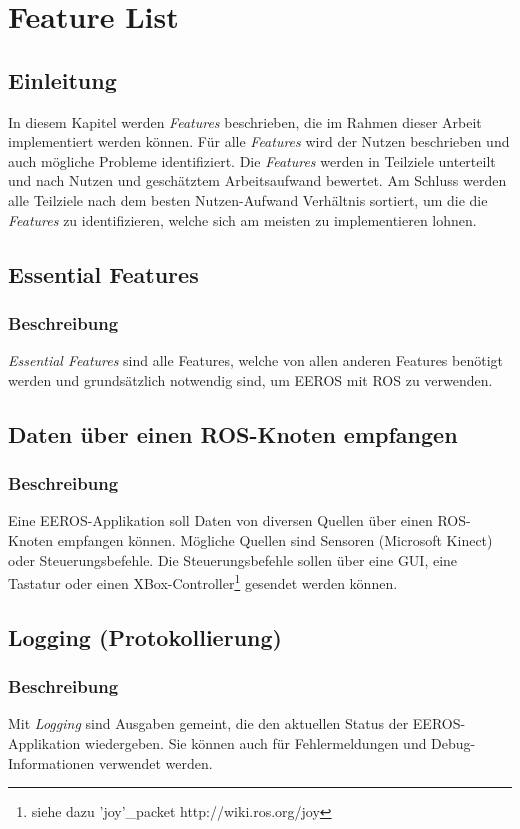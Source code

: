 \chapter{Feature List}
\section{Einleitung}
In diesem Kapitel werden \textit{Features} beschrieben, die im Rahmen dieser Arbeit implementiert werden können.
Für alle \textit{Features} wird der Nutzen beschrieben und auch mögliche Probleme identifiziert.
Die \textit{Features} werden in Teilziele unterteilt und nach Nutzen und geschätztem Arbeitsaufwand bewertet.
Am Schluss werden alle Teilziele nach dem besten Nutzen-Aufwand Verhältnis sortiert, um die die \textit{Features} zu identifizieren, welche sich am meisten zu implementieren lohnen.


\section{Essential Features}
\subsection{Beschreibung}
\textit{Essential Features} sind alle Features, welche von allen anderen Features benötigt werden und grundsätzlich notwendig sind, um EEROS mit ROS zu verwenden.


\section{Daten über einen ROS-Knoten empfangen}
\subsection{Beschreibung}
Eine EEROS-Applikation soll Daten von diversen Quellen über einen ROS-Knoten empfangen können.
Mögliche Quellen sind Sensoren (Microsoft Kinect) oder Steuerungsbefehle.
Die Steuerungsbefehle sollen über eine GUI, eine Tastatur oder einen XBox-Controller\footnote{siehe dazu 'joy'\_packet http://wiki.ros.org/joy} gesendet werden können.


\section{Logging (Protokollierung)}
\subsection{Beschreibung}
Mit \textit{Logging} sind Ausgaben gemeint, die den aktuellen Status der EEROS-Applikation wiedergeben.
Sie können auch für Fehlermeldungen und Debug-Informationen verwendet werden.

